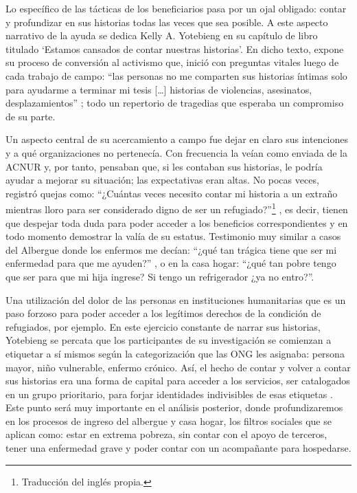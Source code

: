 \documentclass[
  spanish,
  11pt,
  a4paper,
]{scrbook}
\begin{document}
Lo específico de las tácticas de los beneficiarios pasa por un ojal
obligado: contar y profundizar en sus historias todas las veces que sea
posible. A este aspecto narrativo de la ayuda se dedica Kelly A.
Yotebieng en su capítulo de libro titulado `Estamos cansados de contar
nuestras historias'. En dicho texto, expone su proceso de conversión al
activismo que, inició con preguntas vitales luego de cada trabajo de
campo: ``las personas no me comparten sus historias íntimas solo para
ayudarme a terminar mi tesis {[}\ldots{]} historias de violencias,
asesinatos, desplazamientos'' \autocite[151]{Yotebieng2020}; todo un
repertorio de tragedias que esperaba un compromiso de su parte.

Un aspecto central de su acercamiento a campo fue dejar en claro sus
intenciones y a qué organizaciones no pertenecía. Con frecuencia la
veían como enviada de la ACNUR y, por tanto, pensaban que, si les
contaban sus historias, le podría ayudar a mejorar su situación; las
expectativas eran altas. No pocas veces, registró quejas como:
``¿Cuántas veces necesito contar mi historia a un extraño mientras lloro
para ser considerado digno de ser un refugiado?''\footnote{Traducción
  del inglés propia.} \autocite[155]{Yotebieng2020}, es decir, tienen
que despejar toda duda para poder acceder a los beneficios
correspondientes y en todo momento demostrar la valía de su estatus.
Testimonio muy similar a casos del Albergue donde los enfermos me
decían: ``¿qué tan trágica tiene que ser mi enfermedad para que me
ayuden?'' , o en la casa hogar: ``¿qué tan pobre tengo que ser para que
mi hija ingrese? Si tengo un refrigerador ¿ya no entro?''.

Una utilización del dolor de las personas en instituciones humanitarias
que es un paso forzoso para poder acceder a los legítimos derechos de la
condición de refugiados, por ejemplo. En este ejercicio constante de
narrar sus historias, Yotebieng se percata que los participantes de su
investigación se comienzan a etiquetar a sí mismos según la
categorización que las ONG les asignaba: persona mayor, niño vulnerable,
enfermo crónico. Así, el hecho de contar y volver a contar sus historias
era una forma de capital para acceder a los servicios, ser catalogados
en un grupo prioritario, para forjar identidades indivisibles de esas
etiquetas \autocite[157]{Yotebieng2020}. Este punto será muy importante
en el análisis posterior, donde profundizaremos en los procesos de
ingreso del albergue y casa hogar, los filtros sociales que se aplican
como: estar en extrema pobreza, sin contar con el apoyo de terceros,
tener una enfermedad grave y poder contar con un acompañante para
hospedarse.
\end{document}
